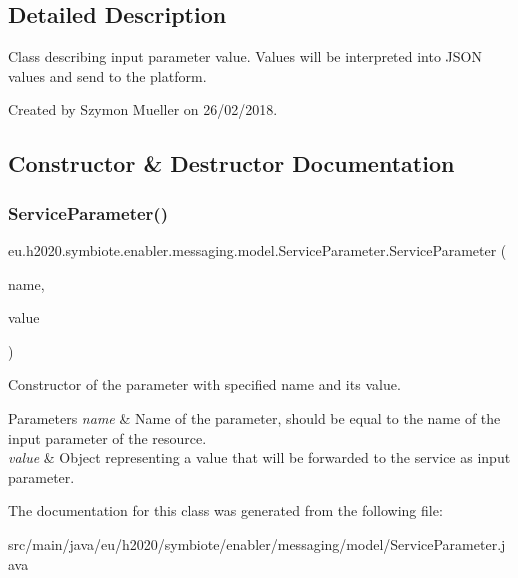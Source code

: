 \subsection{Detailed Description}
Class describing input parameter value. Values will be interpreted into J\+S\+ON values and send to the platform.

Created by Szymon Mueller on 26/02/2018. 

\subsection{Constructor \& Destructor Documentation}
\mbox{\label{classeu_1_1h2020_1_1symbiote_1_1enabler_1_1messaging_1_1model_1_1ServiceParameter_ad0e019c88a6d0eca078c327c39ba7217}} 
\subsubsection{\texorpdfstring{Service\+Parameter()}{ServiceParameter()}}
{\footnotesize\ttfamily eu.\+h2020.\+symbiote.\+enabler.\+messaging.\+model.\+Service\+Parameter.\+Service\+Parameter (\begin{DoxyParamCaption}\item[{@Json\+Property(\char`\"{}name\char`\"{}) String}]{name,  }\item[{@Json\+Property(\char`\"{}value\char`\"{}) Object}]{value }\end{DoxyParamCaption})}

Constructor of the parameter with specified name and it\textquotesingle{}s value. 
\begin{DoxyParams}{Parameters}
{\em name} & Name of the parameter, should be equal to the name of the input parameter of the resource. \\
\hline
{\em value} & Object representing a value that will be forwarded to the service as input parameter. \\
\hline
\end{DoxyParams}


The documentation for this class was generated from the following file\+:\begin{DoxyCompactItemize}
\item 
src/main/java/eu/h2020/symbiote/enabler/messaging/model/Service\+Parameter.\+java\end{DoxyCompactItemize}
